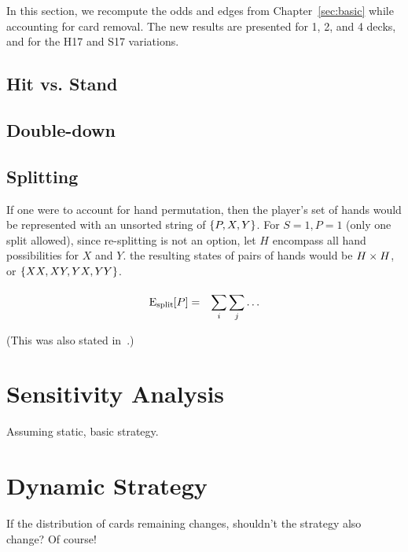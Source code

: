 In this section, we recompute the odds and edges from Chapter~\ref{sec:basic}
while accounting for card removal.
The new results are presented for 1, 2, and 4 decks, 
and for the H17 and S17 variations.  


\subsection{Hit vs. Stand}
\label{sec:counting:odds:hit-stand}

\subsection{Double-down}
\label{sec:counting:odds:double}

\subsection{Splitting}
\label{sec:counting:odds:split}

If one were to account for hand permutation, then the player's set of hands
would be represented with an unsorted string of $\left\{P,X,Y\right\}$.
For $S=1,P=1$ (only one split allowed), 
since re-splitting is not an option,
let $H$ encompass all hand possibilities for $X$ and $Y$.
the resulting states of pairs of hands would be $H\times{}H$, or
$\left\{XX, XY, YX, YY\right\}$.

\begin{eqnarray}
\textrm{E}_{\textrm{split}}\hspace{-.5ex}\left[P\right] &=& \sum_{i}^{}{\sum_{j}^{}{\ldots}}
\end{eqnarray}

(This was also stated in~\cite{ref:griffin99, ref:nairn08}.)

\section{Sensitivity Analysis}
\label{sec:counting:sensitivity}

Assuming static, basic strategy.

\section{Dynamic Strategy}
\label{sec:counting:dynamic}

If the distribution of cards remaining changes, 
shouldn't the strategy also change?
Of course!

